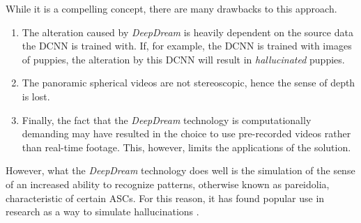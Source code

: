 While it is a compelling concept, there are many drawbacks to this approach.

\begin{enumerate}
    \item The alteration caused by \textit{DeepDream} is heavily dependent on the source data the \ac{DCNN} is trained with. If, for example, the \ac{DCNN} is trained with images of puppies, the alteration by this \ac{DCNN} will result in \textit{hallucinated} puppies.
    \item The panoramic spherical videos are not stereoscopic, hence the sense of depth is lost.
    \item Finally, the fact that the \textit{DeepDream} technology is computationally demanding may have resulted in the choice to use pre-recorded videos rather than real-time footage. This, however, limits the applications of the solution.
\end{enumerate}

However, what the \textit{DeepDream} technology does well is the simulation of the sense of an increased ability to recognize patterns, otherwise known as pareidolia, characteristic of certain \acp{ASC}. For this reason, it has found popular use in research as a way to simulate hallucinations \autocites{greco2021increased}{rastelli2021simulated}.

